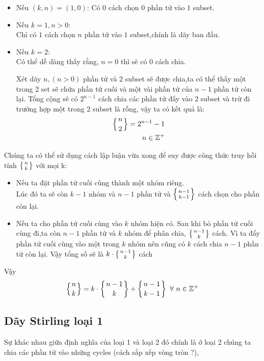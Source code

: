 \begin{itemize}
    \item Nếu $(k,n) = (1,0)$: Có $0$ cách chọn $0$ phần tử vào $1$ subset. 
    \item Nếu $k = 1,n > 0$: 
            \\Chỉ có $1$ cách chọn $n$ phần tử vào $1$ subset,chính là dãy ban đầu.
    \item Nếu $k = 2$: \\
        Có thể dễ dàng thấy rằng, $n = 0$ thì sẽ có $0$ cách chia. 

        Xét dãy $n,(n > 0)$ phần tử và 2 subset sẽ được chia,ta có thể thấy 
        một trong 2 set sẽ chứa phần tử cuối và một vài phần tử của $n - 1$ phần tử 
        còn lại. Tổng cộng sẽ có $2^{n - 1}$ cách chia các phần tử đấy vào 2 subset 
        và trừ đi trường hợp một trong 2 subset là rỗng, vậy ta có kết quả là:
        \begin{equation}
            \begin{aligned}
                \left \{ {n \atop 2} \right \} = 2^{n - 1} - 1 \\
                n \in \mathbb{Z^+}
            \end{aligned}
        \end{equation}
\end{itemize}

\indent
Chúng ta có thể sử dụng cách lập luận vừa xong để suy được công thức truy hồi tính 
$\left \{ {n \atop k} \right \}$ với mọi k:
    \begin{itemize}
        \item Nếu ta đặt phần tử cuối cùng thành một nhóm riêng. \\
            Lúc đó ta sẽ còn $k - 1$ nhóm và $n - 1$ phần tử và
            $\left \{ {n - 1 \atop k - 1} \right \}$ cách chọn cho phần còn lại.
        \item Nếu ta cho phần tử cuối cùng vào $k$ nhóm hiện có.
            Sau khi bỏ phần tử cuối cùng đi,ta còn $n - 1$ phần tử và $k$ nhóm để 
            phân chia, $\left \{ {n - 1 \atop k} \right \}$ cách. Vì ta đẩy phần tử 
            cuối cùng vào một trong $k$ nhóm nên cũng có $k$ cách 
            chia $n - 1$ phần tử còn lại. Vậy tổng số sẽ là 
            $k \cdot \left \{ {n - 1 \atop k} \right \}$ cách
    \end{itemize}
Vậy
\begin{equation}
    \begin{aligned}
        \left \{ {n \atop k} \right \} = 
        k \cdot \left \{ {n - 1 \atop k} \right \} + 
        \left \{ {n -1 \atop k - 1} \right \} \
        \forall \  n \in \mathbb{Z^+}
    \end{aligned}
\end{equation}

\subsection{Dãy Stirling loại 1}
Sự khác nhau giữa định nghĩa của loại 1 và loại 2 đó chính là
ở loại 2 chúng ta chia các phần tử vào những cycles (cách sắp xếp vòng tròn ?),

